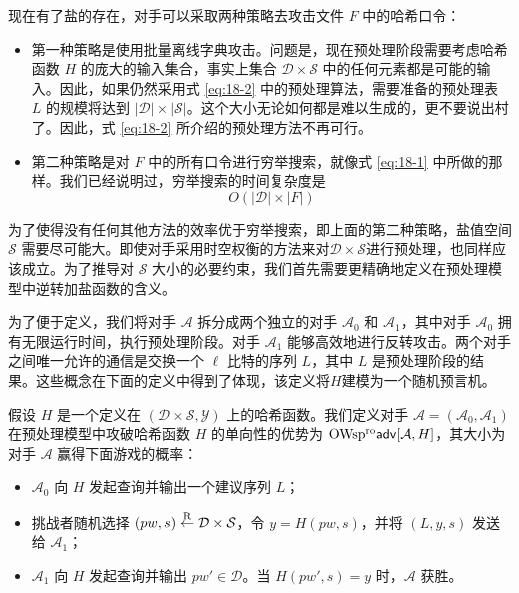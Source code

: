 现在有了盐的存在，对手可以采取两种策略去攻击文件 $F$ 中的哈希口令：

\begin{itemize}
	\item 第一种策略是使用批量离线字典攻击。问题是，现在预处理阶段需要考虑哈希函数 $H$ 的庞大的输入集合，事实上集合 $\mathcal{D}\times\mathcal{S}$ 中的任何元素都是可能的输入。因此，如果仍然采用式 \ref{eq:18-2} 中的预处理算法，需要准备的预处理表 $L$ 的规模将达到 $|\mathcal{D}|\times|\mathcal{S}|$。这个大小无论如何都是难以生成的，更不要说出村了。因此，式 \ref{eq:18-2} 所介绍的预处理方法不再可行。
	\item 第二种策略是对 $F$ 中的所有口令进行穷举搜索，就像式 \ref{eq:18-1} 中所做的那样。我们已经说明过，穷举搜索的时间复杂度是
	\[
	O(|\mathcal{D}|\times |F|)
	\]
\end{itemize}

为了使得没有任何其他方法的效率优于穷举搜索，即上面的第二种策略，盐值空间 $\mathcal{S}$ 需要尽可能大。即使对手采用时空权衡的方法来对$\mathcal{D}\times\mathcal{S}$进行预处理，也同样应该成立。为了推导对 $\mathcal{S}$ 大小的必要约束，我们首先需要更精确地定义在预处理模型中逆转加盐函数的含义。

\begin{snote}[带有预处理的加盐单向函数.]
为了便于定义，我们将对手 $\mathcal{A}$ 拆分成两个独立的对手 $\mathcal{A}_0$ 和 $\mathcal{A}_1$，其中对手 $\mathcal{A}_0$ 拥有无限运行时间，执行预处理阶段。对手 $\mathcal{A}_1$ 能够高效地进行反转攻击。两个对手之间唯一允许的通信是交换一个 $\ell$ 比特的序列 $L$，其中 $L$ 是预处理阶段的结果。这些概念在下面的定义中得到了体现，该定义将$H$建模为一个随机预言机。
\end{snote}

\begin{definition}\label{def:18-3}
	假设 $H$ 是一个定义在 $(\mathcal{D}\times\mathcal{S},\mathcal{Y})$ 上的哈希函数。我们定义对手 $\mathcal{A}=(\mathcal{A}_0,\mathcal{A}_1)$ 在预处理模型中攻破哈希函数 $H$ 的单向性的优势为 ${\rm OWsp^{ro}\mathsf{adv}}[\mathcal{A},H]$，其大小为对手 $\mathcal{A}$ 赢得下面游戏的概率：
	\begin{itemize}
		\item $\mathcal{A}_0$ 向 $H$ 发起查询并输出一个建议序列 $L$；
		\item 挑战者随机选择 $(pw,s)\overset{\rm R}\leftarrow\mathcal{D}\times\mathcal{S}$，令 $y=H(pw,s)$，并将 $(L,y,s)$ 发送给 $\mathcal{A}_1$；
		\item $\mathcal{A}_1$ 向 $H$ 发起查询并输出 $pw'\in\mathcal{D}$。当 $H(pw',s)=y$ 时，$\mathcal{A}$ 获胜。
	\end{itemize}
\end{definition}

